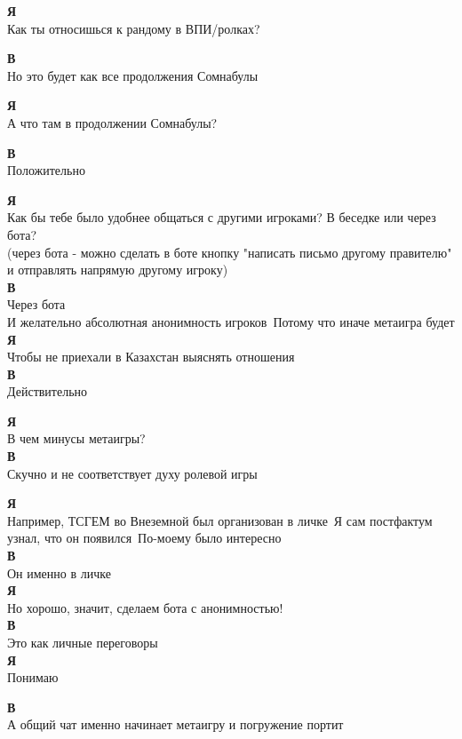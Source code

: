 \textbf{Я}\\
Как ты относишься к рандому в ВПИ/ролках?

\textbf{В}\\
Но это будет как все продолжения Сомнабулы

\textbf{Я}\\
А что там в продолжении Сомнабулы?

\textbf{В}\\
Положительно

\textbf{Я}\\
Как бы тебе было удобнее общаться с другими игроками? В беседке или через бота?\\
(через бота - можно сделать в боте кнопку "написать письмо другому правителю" и отправлять напрямую другому игроку)\\

\textbf{В}\\
Через бота\\
И желательно абсолютная анонимность игроков\
Потому что иначе метаигра будет\\

\textbf{Я}\\
Чтобы не приехали в Казахстан выяснять отношения\\

\textbf{В}\\
Действительно

\textbf{Я}\\
В чем минусы метаигры?\\

\textbf{В}\\
Скучно и не соответствует духу ролевой игры

\textbf{Я}\\
Например, ТСГЕМ во Внеземной был организован в личке\
Я сам постфактум узнал, что он появился\
По-моему было интересно\\

\textbf{В}\\
Он именно в личке\\

\textbf{Я}\\
Но хорошо, значит, сделаем бота с анонимностью!\\

\textbf{В}\\
Это как личные переговоры\\

\textbf{Я}\\
Понимаю

\textbf{В}\\
А общий чат именно начинает метаигру и погружение портит\\

